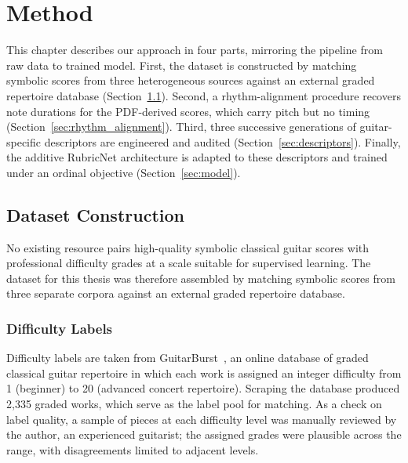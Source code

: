 \chapter{Method}
\label{ch:method}

This chapter describes our approach in four parts, mirroring the pipeline from raw data to trained model. First, the dataset is constructed by matching symbolic scores from three heterogeneous sources against an external graded repertoire database (Section~\ref{sec:dataset}). Second, a rhythm-alignment procedure recovers note durations for the PDF-derived scores, which carry pitch but no timing (Section~\ref{sec:rhythm_alignment}). Third, three successive generations of guitar-specific descriptors are engineered and audited (Section~\ref{sec:descriptors}). Finally, the additive RubricNet architecture is adapted to these descriptors and trained under an ordinal objective (Section~\ref{sec:model}).

\section{Dataset Construction}
\label{sec:dataset}
No existing resource pairs high-quality symbolic classical guitar scores with professional difficulty grades at a scale suitable for supervised learning. The dataset for this thesis was therefore assembled by matching symbolic scores from three separate corpora against an external graded repertoire database.

\subsection{Difficulty Labels}
Difficulty labels are taken from GuitarBurst~\cite{guitarburst}, an online database of graded classical guitar repertoire in which each work is assigned an integer difficulty from 1 (beginner) to 20 (advanced concert repertoire). Scraping the database produced 2{,}335 graded works, which serve as the label pool for matching. As a check on label quality, a sample of pieces at each difficulty level was manually reviewed by the author, an experienced guitarist; the assigned grades were plausible across the range, with disagreements limited to adjacent levels.


